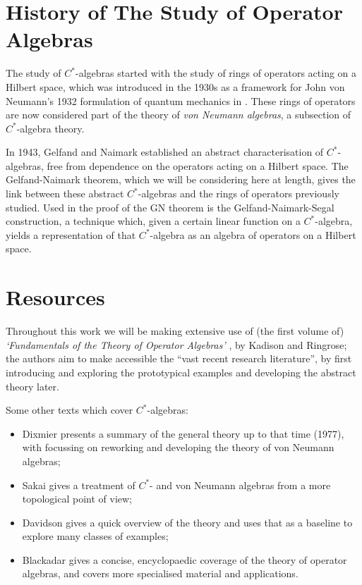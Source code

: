 \documentclass[11pt,a4paper]{report}
\theoremstyle{plain}
\theoremstyle{definition}
\newcommand{\1}{\mathbbm{1}}
\begin{document}
\section{History of The Study of Operator Algebras}
The study of $C^\ast$-algebras started with the study of rings of operators 
acting on a Hilbert space, which was introduced in the 1930s as a framework for 
John von Neumann's 1932 formulation of quantum mechanics in \cite{vonneumann32}. 
These rings of operators are now considered part of the theory of \emph{von 
Neumann algebras}, a subsection of $C^\ast$-algebra theory. 



{In 1943, Gelfand and Naimark \cite{gelfand43} established an abstract 
characterisation of $C^\ast$-algebras, free from dependence on the operators 
acting on a Hilbert space. The Gelfand-Naimark theorem, which we will be 
considering here at length, gives the link between these abstract 
$C^\ast$-algebras and the rings of operators previously studied. Used in the 
proof of the GN theorem is the Gelfand-Naimark-Segal construction, a technique 
which, given a certain linear function on a $C^\ast$-algebra, yields a 
representation of that $C^\ast$-algebra as an algebra of operators on a Hilbert 
space.} 

\section{Resources}
Throughout this work we will be making extensive use of (the first volume of) 
\emph{`Fundamentals of the Theory of Operator Algebras'} 
\cite{kadison83,kadison86}, by Kadison and Ringrose; the authors aim to make 
accessible the ``vast recent research literature'', by first introducing and 
exploring the prototypical examples and developing the abstract theory later. 

	
Some other texts which cover $C^\ast$-algebras: 
\begin{itemize}
	\item 	Dixmier \cite{dixmier77} presents a summary of the general theory up to that time (1977), 
	with \cite{dixmier81} focussing on reworking and developing the theory of von Neumann algebras; 
	\item 	Sakai \cite{sakai71} gives a treatment of $C^\ast$- and von Neumann algebras from a more 
	topological point of view; 
	\item	Davidson \cite{davidson96} gives a quick overview of the theory and uses that as a baseline 
	to explore many classes of examples;
	\item 	Blackadar \cite{blackadar06} gives a concise, encyclopaedic coverage of the theory of 
	operator algebras, and covers more specialised material and applications. 
\end{itemize}
	
\end{document}
